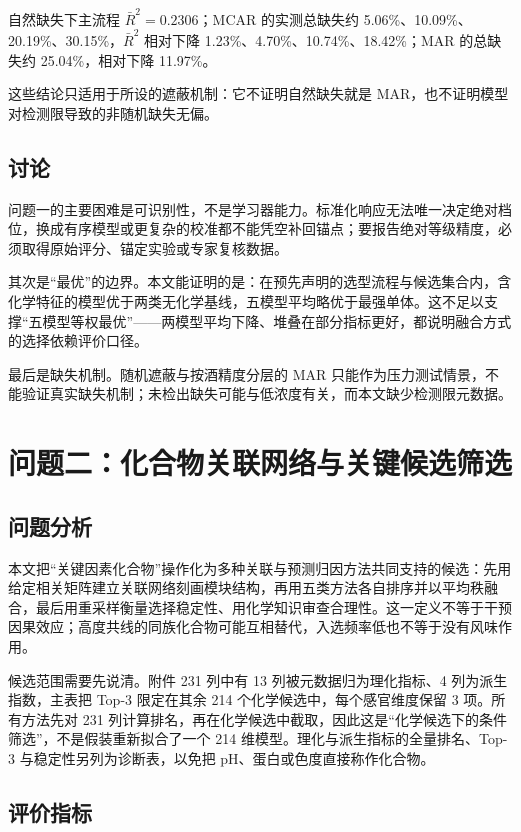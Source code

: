 \documentclass[UTF8,a4paper,zihao=-4]{ctexart}
\numberwithin{figure}{section}
\numberwithin{table}{section}
\numberwithin{equation}{section}
\begin{document}
自然缺失下主流程 $\bar R^2=0.2306$；MCAR 的实测总缺失约 5.06\%、10.09\%、20.19\%、30.15\%，$\bar R^2$ 相对下降 1.23\%、4.70\%、10.74\%、18.42\%；MAR 的总缺失约 25.04\%，相对下降 11.97\%。

这些结论只适用于所设的遮蔽机制：它不证明自然缺失就是 MAR，也不证明模型对检测限导致的非随机缺失无偏。

\subsection{讨论}

问题一的主要困难是可识别性，不是学习器能力。标准化响应无法唯一决定绝对档位，换成有序模型或更复杂的校准都不能凭空补回锚点；要报告绝对等级精度，必须取得原始评分、锚定实验或专家复核数据。

其次是“最优”的边界。本文能证明的是：在预先声明的选型流程与候选集合内，含化学特征的模型优于两类无化学基线，五模型平均略优于最强单体。这不足以支撑“五模型等权最优”——两模型平均下降、堆叠在部分指标更好，都说明融合方式的选择依赖评价口径。

最后是缺失机制。随机遮蔽与按酒精度分层的 MAR 只能作为压力测试情景，不能验证真实缺失机制；未检出缺失可能与低浓度有关，而本文缺少检测限元数据。

\section{问题二：化合物关联网络与关键候选筛选}
\label{sec:q2}

\subsection{问题分析}

本文把“关键因素化合物”操作化为多种关联与预测归因方法共同支持的候选：先用给定相关矩阵建立关联网络刻画模块结构，再用五类方法各自排序并以平均秩融合，最后用重采样\cite{efron1979}衡量选择稳定性、用化学知识审查合理性。这一定义不等于干预因果效应；高度共线的同族化合物可能互相替代，入选频率低也不等于没有风味作用。

候选范围需要先说清。附件 231 列中有 13 列被元数据归为理化指标、4 列为派生指数，主表把 Top-3 限定在其余 214 个化学候选中，每个感官维度保留 3 项。所有方法先对 231 列计算排名，再在化学候选中截取，因此这是“化学候选下的条件筛选”，不是假装重新拟合了一个 214 维模型。理化与派生指标的全量排名、Top-3 与稳定性另列为诊断表，以免把 pH、蛋白或色度直接称作化合物。

\subsection{评价指标}
\end{document}
